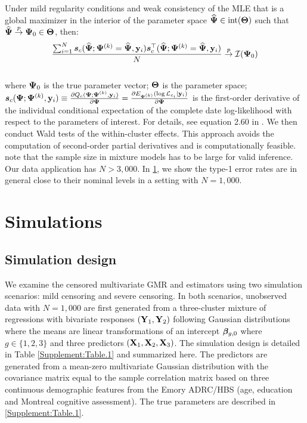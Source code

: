 \documentclass{interact}
\theoremstyle{plain}
\theoremstyle{definition}
\theoremstyle{remark}
\begin{document}
Under mild regularity conditions and weak consistency of the MLE that is a global maximizer in the interior of the parameter space $\widehat{\bm{\Psi}} \in \mathrm{int}(\bm{\Theta})$ such that  $\widehat{\bm{\Psi}}\overset{p}{\to}\bm{\Psi}_0\in \bm{\Theta}$, then: 
\begin{equation}
    \frac{\sum_{i=1}^N\bm{s}_c(\widehat{\bm{\Psi}};\bm{\Psi}^{(k)}=\widehat{\bm{\Psi}},\mathbf{y}_i)\bm{s}_c^\top(\widehat{\bm{\Psi}};\bm{\Psi}^{(k)}=\widehat{\bm{\Psi}},\mathbf{y}_i)}{N}\overset{p}{\to}\mathcal{I}(\bm{\Psi}_0)
\end{equation}\\
where $\bm{\Psi}_0$ is the true parameter vector; $\bm{\Theta}$ is the parameter space; $\bm{s}_c(\bm{\Psi};\bm{\Psi}^{(k)}, \mathbf{y}_i)\equiv\frac{\partial Q_c(\bm{\Psi};\bm{\Psi}^{(k)}, \mathbf{y}_i)}{\partial \bm{\Psi}}=\frac{\partial E_{\bm{\Psi}^{(k)}}(\log \mathcal{L}_{c_i}|\mathbf{y}_i)}{\partial \bm{\Psi}}$ is the first-order derivative of the individual conditional expectation of the complete date log-likelihood with respect to the parameters of interest. For details, see equation 2.60 in \cite{McLachlan2000}. We then conduct Wald tests of the within-cluster effects. This approach avoids the computation of second-order partial derivatives and is computationally feasible. \cite{McLachlan2000} note that the sample size in mixture models has to be large for valid inference. Our data application has $N>3,\!000$. In \cref{sec:simulation}, we show the type-1 error rates are in general close to their nominal levels in a setting with $N=1,\!000$.

\section{Simulations}
\label{sec:simulation}
\subsection{Simulation design}
We examine the censored multivariate GMR and estimators using two simulation scenarios: mild censoring and severe censoring. In both scenarios, unobserved data with $N=1,\!000$ are first generated from a three-cluster mixture of regressions with bivariate responses $(\mathbf{Y}_1,\mathbf{Y}_2)$ following Gaussian distributions where the means are linear transformations of an intercept ${\bm \beta}_{g,0}$ where $g\in \{1,2,3\}$ and three predictors $(\mathbf{X}_1, \mathbf{X}_2, \mathbf{X}_3)$. The simulation design is detailed in Table \ref{Supplement:Table.1} and summarized here. The predictors are generated from a mean-zero multivariate Gaussian distribution with the covariance matrix equal to the sample correlation matrix based on three continuous demographic features from the Emory ADRC/HBS (age, education and Montreal cognitive assessment). The true parameters are described in \cref{Supplement:Table.1}. 
\end{document}
